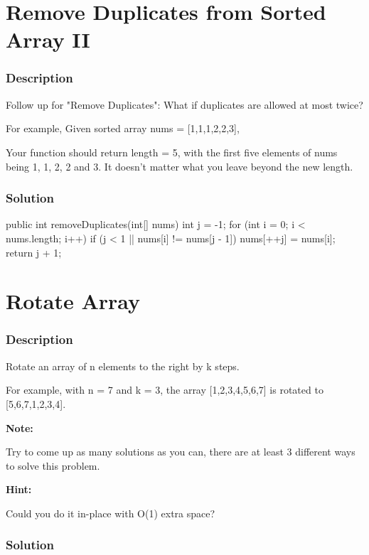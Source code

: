 \newpage

\section{Remove Duplicates from Sorted Array II} %

\subsubsection{Description}
Follow up for "Remove Duplicates":
What if duplicates are allowed at most twice?

For example,
Given sorted array nums = [1,1,1,2,2,3],

Your function should return length = 5, with the first five elements of nums being 1, 1, 2, 2 and 3. It doesn't matter what you leave beyond the new length.

\subsubsection{Solution}

\begin{Code}
public int removeDuplicates(int[] nums) {
    int j = -1;
    for (int i = 0; i < nums.length; i++) {
        if (j < 1 || nums[i] != nums[j - 1]) {
            nums[++j] = nums[i];
        }
    }
    return j + 1;
}
\end{Code}

\newpage

\section{Rotate Array} %

\subsubsection{Description}
Rotate an array of n elements to the right by k steps.

For example, with n = 7 and k = 3, the array [1,2,3,4,5,6,7] is rotated to [5,6,7,1,2,3,4].

\textbf{Note:}

Try to come up as many solutions as you can, there are at least 3 different ways to solve this problem.

\textbf{Hint:}

Could you do it in-place with O(1) extra space?

\subsubsection{Solution}


